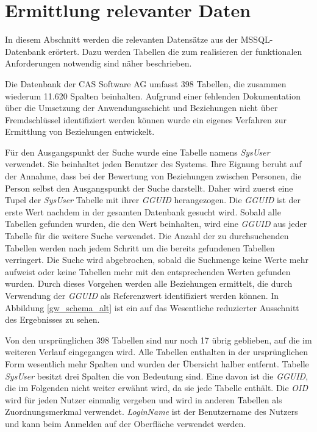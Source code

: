 \section{Ermittlung relevanter Daten}
\label{ch:Systemanalyse:sec:Information}

In diesem Abschnitt werden die relevanten Datensätze aus der MSSQL-Datenbank erörtert. Dazu werden Tabellen die zum realisieren der funktionalen Anforderungen notwendig sind näher beschrieben.

Die Datenbank der CAS Software AG umfasst 398 Tabellen, die zusammen wiederum 11.620 Spalten beinhalten. Aufgrund einer fehlenden Dokumentation über die Umsetzung der Anwendungsschicht und Beziehungen nicht über Fremdschlüssel identifiziert werden können wurde ein eigenes Verfahren zur Ermittlung von Beziehungen entwickelt. 

Für den Ausgangspunkt der Suche wurde eine Tabelle namens \textit{SysUser} verwendet. Sie beinhaltet jeden Benutzer des Systems. Ihre Eignung beruht auf der Annahme, dass bei der Bewertung von Beziehungen zwischen Personen, die Person selbst den Ausgangspunkt der Suche darstellt. Daher wird zuerst eine Tupel der \textit{SysUser} Tabelle mit ihrer \textit{GGUID} herangezogen. Die \textit{GGUID} ist der erste Wert nachdem in der gesamten Datenbank gesucht wird. Sobald alle Tabellen gefunden wurden, die den Wert beinhalten, wird eine \textit{GGUID} aus jeder Tabelle für die weitere Suche verwendet. Die Anzahl der zu durchsuchenden Tabellen werden nach jedem Schritt um die bereits gefundenen Tabellen verringert. Die Suche wird abgebrochen, sobald die Suchmenge keine Werte mehr aufweist oder keine Tabellen mehr mit den entsprechenden Werten gefunden wurden. Durch dieses Vorgehen werden alle Beziehungen ermittelt, die durch Verwendung der \textit{GGUID} als Referenzwert identifiziert werden können. In Abbildung \ref{gw_schema_alt} ist ein auf das Wesentliche reduzierter Ausschnitt des Ergebnisses zu sehen. 

Von den ursprünglichen 398 Tabellen sind nur noch 17 übrig geblieben, auf die im weiteren Verlauf eingegangen wird. Alle Tabellen enthalten in der ursprünglichen Form wesentlich mehr Spalten und wurden der Übersicht halber entfernt. Tabelle \textit{SysUser} besitzt drei Spalten die von Bedeutung sind. Eine davon ist die \textit{GGUID}, die im Folgenden nicht weiter erwähnt wird, da sie jede Tabelle enthält. Die \textit{OID} wird für jeden Nutzer einmalig vergeben und wird in anderen Tabellen als Zuordnungsmerkmal verwendet. \textit{LoginName} ist der Benutzername des Nutzers und kann beim Anmelden auf der Oberfläche verwendet werden. 

